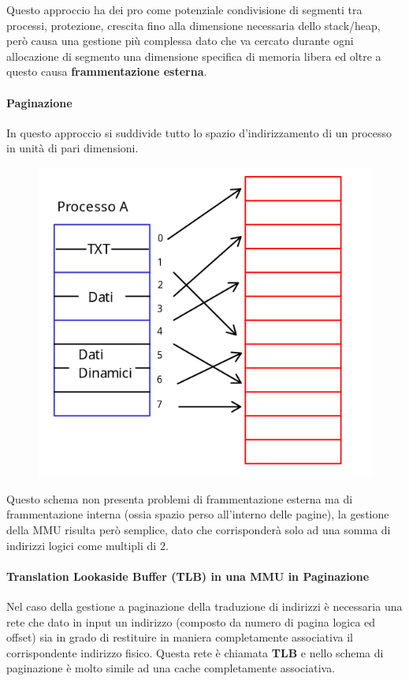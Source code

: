 \documentclass{article}
\begin{document}
Questo approccio ha dei pro come potenziale condivisione di segmenti tra processi, protezione, crescita fino alla dimensione necessaria dello stack/heap, però causa una gestione più complessa dato che va cercato durante ogni allocazione di segmento una dimensione specifica di memoria libera ed oltre a questo causa \textbf{frammentazione esterna}.

\paragraph{Paginazione} In questo approccio si suddivide tutto lo spazio d'indirizzamento di un processo in unità di pari dimensioni.

\begin{figure}[htbp]
    \center
    \includegraphics[scale=0.3]{img/paginazione.png}
\end{figure}

Questo schema non presenta problemi di frammentazione esterna ma di frammentazione interna (ossia spazio perso all'interno delle pagine), la gestione della MMU risulta però semplice, dato che corrisponderà solo ad una somma di indirizzi logici come multipli di $2$.

\newpage

\paragraph{Translation Lookaside Buffer (TLB) in una MMU in Paginazione} Nel caso della gestione a paginazione della traduzione di indirizzi è necessaria una rete che dato in input un indirizzo (composto da numero di pagina logica ed offset) sia in grado di restituire in maniera completamente associativa il corrispondente indirizzo fisico. Questa rete è chiamata \textbf{TLB}
e nello schema di paginazione è molto simile ad una cache completamente associativa.
\end{document}
